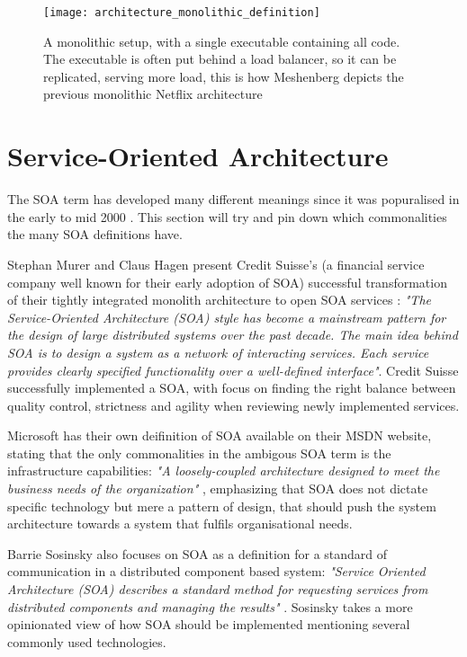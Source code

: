 \begin{figure}[!htb]
\begin{center} 
  \texttt{[image: architecture\_monolithic\_definition]}  
  \caption{A monolithic setup, with a single executable containing all code. The executable is often put behind a load balancer, so it can be replicated, serving more load, this is how Meshenberg depicts the previous monolithic Netflix architecture}
  \label{fig:architecture_monolithic_definition}
  \end{center} 
\end{figure}

\section{Service-Oriented Architecture}
The SOA term has developed many different meanings \cite{microsoft2017chapter, george2016it, murer2015fifteen, sosinsky2010cloud, fowler2014microservicesoamonolith} since it was popuralised in the early to mid 2000 \cite[t.16:00]{george2016it}. This section will try and pin down which commonalities the many SOA definitions have.

Stephan Murer and Claus Hagen present Credit Suisse's (a financial service company well known for their early adoption of SOA) successful transformation of their tightly integrated monolith architecture to open SOA services  \cite{murer2015fifteen}: \textit{"The Service-Oriented Architecture (SOA) style has become a mainstream pattern for the design of large distributed systems over the past decade. The main idea behind SOA is to design a system as a network of interacting services. Each service provides clearly specified functionality over a well-defined interface"}. Credit Suisse successfully implemented a SOA, with focus on finding the right balance between quality control, strictness and agility when reviewing newly implemented services.

Microsoft has their own deifinition of SOA available on their MSDN website, stating that the only commonalities in the ambigous SOA term is the infrastructure capabilities: \textit{"A loosely‐coupled architecture designed to meet the business needs of the organization"} \cite{microsoft2017chapter}, emphasizing that SOA does not dictate specific technology but mere a pattern of design, that should push the system architecture towards a system that fulfils organisational needs.

Barrie Sosinsky also focuses on SOA as a definition for a standard of communication in a distributed component based system: \textit{"Service Oriented Architecture (SOA) describes a standard method for requesting services from distributed components and managing the results"} \cite{sosinsky2010cloud}. Sosinsky takes a more opinionated view of how SOA should be implemented mentioning several commonly used technologies.

